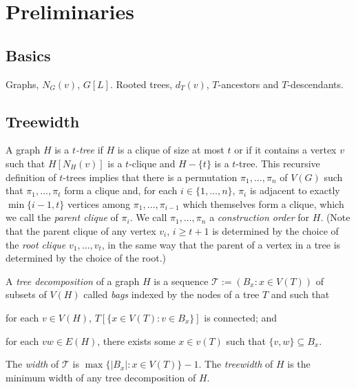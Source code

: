 \documentclass[kpfonts]{patmorin}
\newcommand{\uqs}{\chi_2}
\newcommand{\hus}{\hat{\chi}_2}
\begin{document}
%
%
%

\section{Preliminaries}

\subsection{Basics}

Graphs, $N_G(v)$, $G[L]$.
Rooted trees, $d_T(v)$, $T$-ancestors and $T$-descendants.

\subsection{Treewidth}

A graph $H$ is a \emph{$t$-tree} if $H$ is a clique of size at most $t$ or if it contains a vertex $v$ such that $H[N_H(v)]$ is a $t$-clique and $H-\{t\}$ is a $t$-tree.  This recursive definition of $t$-trees implies that there is a permutation $\pi_1,\ldots,\pi_n$ of $V(G)$ such that $\pi_1,\ldots,\pi_t$ form a clique and, for each $i\in\{1,\ldots,n\}$, $\pi_i$ is adjacent to exactly $\min\{i-1,t\}$ vertices among $\pi_1,\ldots,\pi_{i-1}$ which themselves form a clique, which we call the \emph{parent clique} of $\pi_i$.  We call $\pi_1,\ldots,\pi_n$ a \emph{construction order} for $H$.  (Note that the parent clique of any vertex $v_i$, $i\ge t+1$ is determined by the choice of the \emph{root clique} $v_1,\ldots,v_t$, in the same way that the parent of a vertex in a tree is determined by the choice of the root.)

A \emph{tree decomposition} of a graph $H$ is a sequence $\mathcal{T}:=(B_x:x\in V(T))$ of subsets of $V(H)$ called \emph{bags} indexed by the nodes of a tree $T$ and such that
 \begin{inparaenum}[(i)]
     \item for each $v\in V(H)$, $T[\{x\in V(T):v\in B_x\}]$ is connected; and
     \item for each $vw\in E(H)$, there exists some $x\in v(T)$ such that $\{v,w\}\subseteq B_x$.
\end{inparaenum}
The \emph{width} of $\mathcal{T}$ is $\max\{|B_x|:x\in V(T)\}-1$. The \emph{treewidth} of $H$ is the minimum width of any tree decomposition of $H$.
\end{document}
